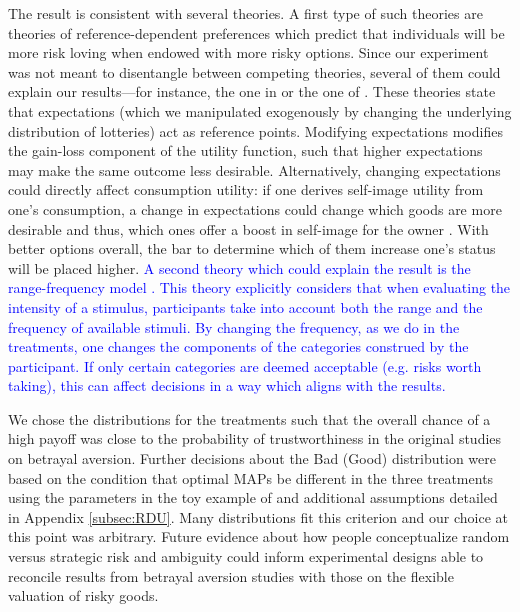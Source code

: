 The result is consistent with several theories.
A first type of such theories are theories of reference-dependent preferences which predict that individuals will be more risk loving when endowed with more risky options.
Since our experiment was not meant to disentangle between competing theories, several of them could explain our results---for instance, the one in \cite{Koszegi2006,Koszegi2007} or the one of \cite{Wenner2015}.
These theories state that expectations (which we manipulated exogenously by changing the underlying distribution of lotteries) act as reference points.
Modifying expectations modifies the gain-loss component of the utility function, such that higher expectations may make the same outcome less desirable.
Alternatively, changing expectations could directly affect consumption utility: if one derives self-image utility from one's consumption, a change in expectations could change which goods are more desirable and thus, which ones offer a boost in self-image for the owner \citep{Strahilevitz1998,Marzilli2011}.
With better options overall, the bar to determine which of them increase one's status will be placed higher.
\textcolor{blue}{A second theory which could explain the result is the range-frequency model \citep{Parducci1965,Parducci1971}.
This theory explicitly considers that when evaluating the intensity of a stimulus, participants take into account both the range and the frequency of available stimuli. By changing the frequency, as we do in the treatments, one changes the components of the categories construed by the participant. If only certain categories are deemed acceptable (e.g. risks worth taking), this can affect decisions in a way which aligns with the results.}

We chose the distributions for the treatments such that the overall chance of a high payoff was close to the probability of trustworthiness in the original studies on betrayal aversion.
Further decisions about the Bad (Good) distribution were based on the condition that optimal MAPs be different in the three treatments using the parameters in the toy example of \cite{Li2020a} and additional assumptions detailed in Appendix \ref{subsec:RDU}.
Many distributions fit this criterion and our choice at this point was arbitrary.
Future evidence about how people conceptualize random versus strategic risk and ambiguity could inform experimental designs able to reconcile results from betrayal aversion studies with those on the flexible valuation of risky goods.


